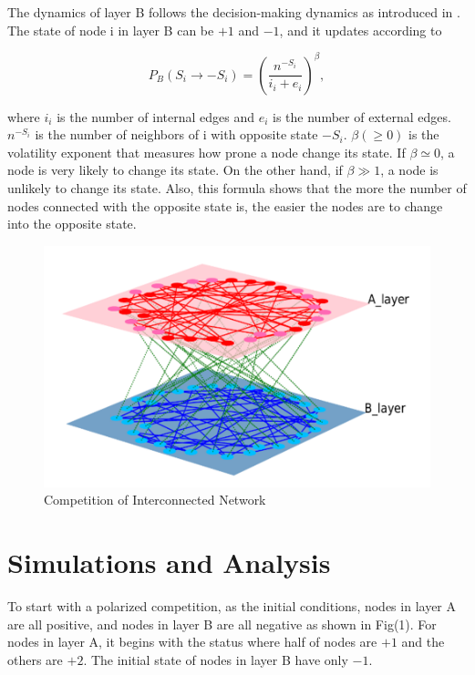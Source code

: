 \documentclass[english]{cccconf}
\begin{document}
The dynamics of layer B follows the decision-making dynamics as introduced in \cite{abrams2003, vazquez2010}. The state of node i in layer B can be $+1$ and $-1$, and it updates according to

\begin{equation}
{P_B}({S_i} \rightarrow - {S_i}) = {\left( {\frac{{{n^{ - {S_i}}}}}{{{i_i} + {e_i}}}} \right)^\beta },
\end{equation}

where $i_i$ is the number of internal edges and $e_i$ is the number of external edges. $n^{-S_i}$ is the number of neighbors of i with opposite state $-S_i$. $\beta(\geq 0)$ is the volatility exponent that measures how prone a node change its state. If $\beta \simeq 0$, a node is very likely to change its state. On the other hand, if $\beta \gg 1$, a node is unlikely to change its state. Also, this formula shows that the more the number of nodes connected with the opposite state is, the easier the nodes are to change into the opposite state.\\
\begin{figure}[!htb]
  \centering
  \includegraphics[width=\hsize]{FIG1.png}
  \caption{Competition of Interconnected Network}
  \label{Fig1}
\end{figure}


\section{Simulations and Analysis}
To start with a polarized competition, as the initial conditions,  nodes in layer A are all positive, and nodes in layer B are all negative as shown in Fig(1). For nodes in layer A, it begins with the status where half of nodes are $+1$ and the others are $+2$. The initial state of nodes in layer B have only $-1$. 
\end{document}
